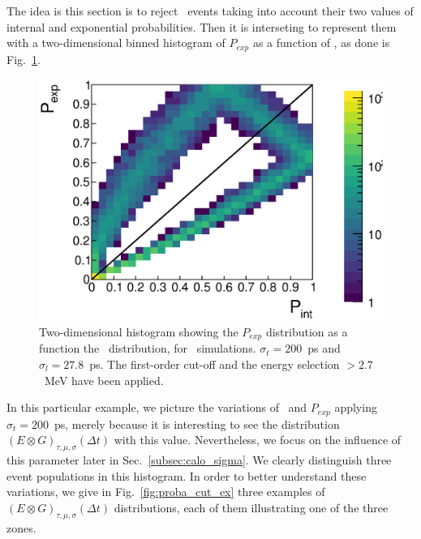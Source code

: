 The idea is this section is to reject \Tl\ events taking into account their two values of internal and exponential probabilities.
Then it is interseting to represent them with a two-dimensional binned histogram of $P_{exp}$ as a function of \Pint, as done is Fig.~\ref{fig:biplot_Pexp_Pint}.
\begin{figure}[!h]
  \centering
  \includegraphics[width=15cm]{timedifference/fig_timediff/PintVSPexp_208Tl.eps}
  \caption{Two-dimensional histogram showing the $P_{exp}$ distribution as a function the \Pint\ distribution, for \Tl\ simulations.
    $\sigma_{t}=200$~ps and $\sigma_{l}=27.8$~ps.
    The first-order cut-off and the energy selection $>2.7$~MeV have been applied.
    \label{fig:biplot_Pexp_Pint}}
\end{figure}
In this particular example, we picture the variations of \Pint\ and $P_{exp}$ applying ${\sigma_{t}=200}$~ps, merely because it is interesting to see the distribution ${(E \otimes G)_{\tau,\mu,\sigma}(\Delta t)}$ with this value.
Nevertheless, we focus on the influence of this parameter later in Sec.~\ref{subsec:calo_sigma}.
We clearly distinguish three event populations in this histogram.
In order to better understand these variations, we give in Fig.~\ref{fig:proba_cut_ex} three examples of ${(E \otimes G)_{\tau,\mu,\sigma}(\Delta t)}$ distributions, each of them illustrating one of the three zones.
